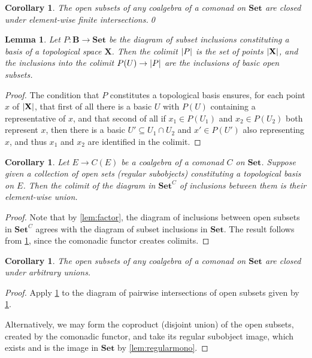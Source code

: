 \documentclass[11pt, oneside, article]{memoir}
\theoremstyle{plain}
\newtheorem{corollary}[theorem]{Corollary}
\newtheorem{lemma}[theorem]{Lemma}
\theoremstyle{definition}
\theoremstyle{remark}
\DeclarePairedDelimiter{\abs}{\lvert}{\rvert}
\newcommand{\namedcat}[1]{\mathbf{#1}}
\newcommand{\cat}[1]{\mathbf{#1}}
\newcommand{\spa}[1]{\mathbf{#1}}
\newcommand{\Set}{\namedcat{Set}}
\newcommand{\CoalgOn}[2]{{#2}^{#1}}
\newcommand{\CoalgSet}[1]{\CoalgOn{#1}{\Set}}
\newcommand{\pts}[1]{{\abs{#1}}}
\newcommand{\ph}[1]{#1}
\newcommand{\cmnd}[1]{{#1}}
\newcommand{\eE}{E}
\newcommand{\xU}{U}
\newcommand{\cC}{\cmnd{C}}
\newcommand{\bB}{\cat{B}}
\newcommand{\pP}{\ph{P}}
\newcommand{\tX}{\spa{X}}
\newcommand{\CSet}{\CoalgSet{\cC}}
\begin{document}

\begin{corollary}\label{lem:intersection}
  The open subsets of any coalgebra of a comonad on $\Set$ are closed
  under element-wise finite intersections.\qed
\end{corollary}

\begin{lemma}\label{lem:coconfluentinjections}
  Let $\pP \colon \bB \to \Set$ be the diagram of subset inclusions
  constituting a basis of a topological space $\tX$. Then the colimit
  $\pts{\pP}$ is the set of points $\pts{\tX}$, and the inclusions
  into the colimit $\pP(\xU) \to \pts{\pP}$ are the inclusions of basic
  open subsets.
\end{lemma}
\begin{proof}
  The condition that $\pP$ constitutes a topological basis ensures,
  for each point $x$ of $\pts{\tX}$, that first of all there is a
  basic $\xU$ with $\pP(\xU)$ containing a representative of $x$, and
  that second of all if $x_1 \in \pP(\xU_1)$ and $x_2 \in \pP(\xU_2)$ both
  represent $x$, then there is a basic $\xU' \subseteq \xU_1 \cap U_2$ and
  $x' \in \pP(\xU')$ also representing $x$, and thus $x_1$ and $x_2$ are
  identified in the colimit.
\end{proof}

\begin{corollary}\label{cor:subcoalgebrabasis}
  Let $\eE\to\cC(\eE)$ be a coalgebra of a comonad $\cC$ on $\Set$.
  Suppose given a collection of open sets (regular subobjects)
  constituting a topological basis on $\eE$. Then the colimit of the
  diagram in $\CSet$ of inclusions between them is their element-wise
  union.
\end{corollary}
\begin{proof}
  Note that by \cref{lem:factor}, the diagram of inclusions between
  open subsets in $\CSet$ agrees with the diagram of subset inclusions
  in $\Set$. The result follows from \cref{lem:coconfluentinjections},
  since the comonadic functor creates colimits.
\end{proof}

\begin{corollary}\label{lem:union}
  The open subsets of any coalgebra of a comonad on $\Set$ are closed
  under arbitrary unions.
\end{corollary}
\begin{proof}
  Apply \cref{cor:subcoalgebrabasis} to the diagram of pairwise
  intersections of open subsets given by \cref{lem:intersection}.

  Alternatively, we may form the coproduct (disjoint union) of the
  open subsets, created by the comonadic functor, and take its regular
  subobject image, which exists and is the image in $\Set$ by
  \cref{lem:regularmono}.
\end{proof}
\end{document}
